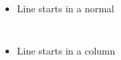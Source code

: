 \documentclass{beamer}
\begin{document}
	
\begin{frame}
	\begin{itemize} 
  \item Line starts in a normal 
  \end{itemize} 
  \begin{columns}[c,onlytextwidth] 
    \begin{itemize} 
      \item Line starts in a column 
    \end{itemize} 
  \end{columns}
\end{frame}	
	
\end{document}
